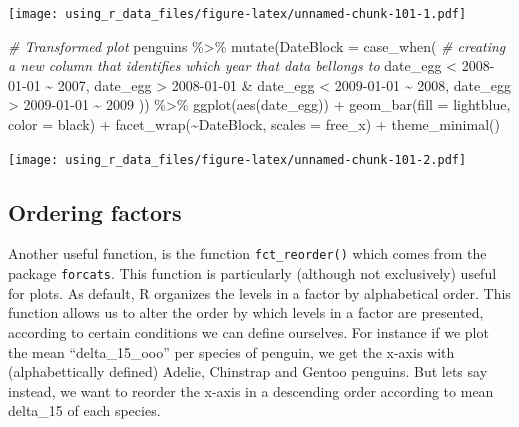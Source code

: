 \documentclass[
]{book}
\newenvironment{Shaded}{\begin{snugshade}}{\end{snugshade}}
\newcommand{\AttributeTok}[1]{\textcolor[rgb]{0.77,0.63,0.00}{#1}}
\newcommand{\CommentTok}[1]{\textcolor[rgb]{0.56,0.35,0.01}{\textit{#1}}}
\newcommand{\FunctionTok}[1]{\textcolor[rgb]{0.00,0.00,0.00}{#1}}
\newcommand{\NormalTok}[1]{#1}
\newcommand{\SpecialCharTok}[1]{\textcolor[rgb]{0.00,0.00,0.00}{#1}}
\newcommand{\StringTok}[1]{\textcolor[rgb]{0.31,0.60,0.02}{#1}}
\begin{document}
\texttt{[image: using\_r\_data\_files/figure-latex/unnamed-chunk-101-1.pdf]}

\begin{Shaded}
\begin{Highlighting}[]
\CommentTok{\# Transformed plot}
\NormalTok{penguins }\SpecialCharTok{\%\textgreater{}\%} 
  \FunctionTok{mutate}\NormalTok{(}\AttributeTok{DateBlock =} \FunctionTok{case\_when}\NormalTok{(  }\CommentTok{\# creating a new column that identifies which year that data bellongs to}
\NormalTok{    date\_egg }\SpecialCharTok{\textless{}} \StringTok{\textquotesingle{}2008{-}01{-}01\textquotesingle{}} \SpecialCharTok{\textasciitilde{}} \StringTok{\textquotesingle{}2007\textquotesingle{}}\NormalTok{,}
\NormalTok{    date\_egg }\SpecialCharTok{\textgreater{}} \StringTok{\textquotesingle{}2008{-}01{-}01\textquotesingle{}} \SpecialCharTok{\&}\NormalTok{ date\_egg }\SpecialCharTok{\textless{}} \StringTok{\textquotesingle{}2009{-}01{-}01\textquotesingle{}} \SpecialCharTok{\textasciitilde{}} \StringTok{\textquotesingle{}2008\textquotesingle{}}\NormalTok{,}
\NormalTok{    date\_egg }\SpecialCharTok{\textgreater{}} \StringTok{\textquotesingle{}2009{-}01{-}01\textquotesingle{}}  \SpecialCharTok{\textasciitilde{}} \StringTok{\textquotesingle{}2009\textquotesingle{}}
\NormalTok{  )) }\SpecialCharTok{\%\textgreater{}\%} 
  \FunctionTok{ggplot}\NormalTok{(}\FunctionTok{aes}\NormalTok{(date\_egg)) }\SpecialCharTok{+}
  \FunctionTok{geom\_bar}\NormalTok{(}\AttributeTok{fill =} \StringTok{\textquotesingle{}lightblue\textquotesingle{}}\NormalTok{, }\AttributeTok{color =} \StringTok{\textquotesingle{}black\textquotesingle{}}\NormalTok{) }\SpecialCharTok{+} 
  \FunctionTok{facet\_wrap}\NormalTok{(}\SpecialCharTok{\textasciitilde{}}\NormalTok{DateBlock, }\AttributeTok{scales =} \StringTok{\textquotesingle{}free\_x\textquotesingle{}}\NormalTok{) }\SpecialCharTok{+}
  \FunctionTok{theme\_minimal}\NormalTok{()}
\end{Highlighting}
\end{Shaded}

\texttt{[image: using\_r\_data\_files/figure-latex/unnamed-chunk-101-2.pdf]}

\hypertarget{ordering-factors}{%
\subsection{Ordering factors}\label{ordering-factors}}

Another useful function, is the function \texttt{fct\_reorder()} which comes from the package \texttt{forcats}.
This function is particularly (although not exclusively) useful for plots.
As default, R organizes the levels in a factor by alphabetical order.
This function allows us to alter the order by which levels in a factor are presented, according to certain conditions we can define ourselves.
For instance if we plot the mean ``delta\_15\_ooo'' per species of penguin, we get the x-axis with (alphabettically defined) Adelie, Chinstrap and Gentoo penguins.
But lets say instead, we want to reorder the x-axis in a descending order according to mean delta\_15 of each species.
\end{document}

